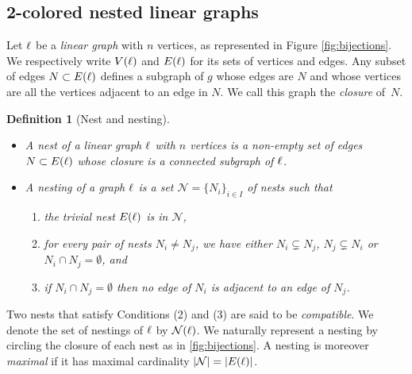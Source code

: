 \documentclass[twoside, 12pt]{amsart}
\newtheorem{definition}{Definition}[section]
\theoremstyle{remark}
\begin{document}

\subsection{2-colored nested linear graphs} \label{ss:2-col}

Let $\ell$ be a \emph{linear graph} with $n$ vertices, as represented in Figure \ref{fig:bijections}.
We respectively write $V(\ell)$ and $E(\ell)$ for its sets of vertices and edges.
Any subset of edges $N\subset E(\ell)$ defines a subgraph of $g$ whose edges are $N$ and whose vertices are all the vertices adjacent to an edge in $N$. 
We call this graph the \emph{closure} of~$N$. 

\begin{definition}[Nest and nesting]
\leavevmode
\begin{itemize}[leftmargin=*]
\item A \emph{nest} of a linear graph $\ell$ with $n$ vertices is a non-empty set of edges $N \subset E(\ell)$ whose closure is a connected subgraph of $\ell$.  
\item A \emph{nesting} of a graph $\ell$ is a set $\mathcal{N}=\{N_i\}_{i\in I}$ of nests such that 
\begin{enumerate}[leftmargin=*]
    \item the \emph{trivial nest} $E(\ell)$ is in $\mathcal{N}$,
    \item for every pair of nests $N_i\neq N_j$, we have either $N_i \subsetneq N_j$, $N_j \subsetneq N_i$ or $N_i \cap N_j = \emptyset$, and
    \item if $N_i \cap N_j = \emptyset$ then no edge of $N_i$ is adjacent to an edge of $N_j$.
\end{enumerate}
\end{itemize}
\end{definition}

Two nests that satisfy Conditions (2) and (3) are said to be \textit{compatible}. 
We denote the set of nestings of $\ell$ by $\mathcal{N}(\ell)$. 
We naturally represent a nesting by circling the closure of each nest as in \cref{fig:bijections}. 
A nesting is moreover \emph{maximal} if it has maximal cardinality $|\mathcal{N}|=|E(\ell)|$.
\end{document}
